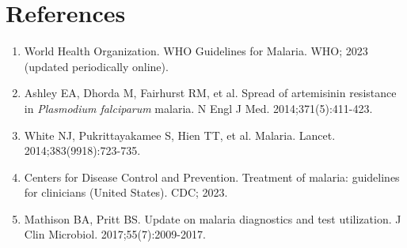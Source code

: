 \section*{References}
\begin{enumerate}
  \item World Health Organization. WHO Guidelines for Malaria. WHO; 2023 (updated periodically online).
  \item Ashley EA, Dhorda M, Fairhurst RM, et al. Spread of artemisinin resistance in \textit{Plasmodium falciparum} malaria. N Engl J Med. 2014;371(5):411-423.
  \item White NJ, Pukrittayakamee S, Hien TT, et al. Malaria. Lancet. 2014;383(9918):723-735.
  \item Centers for Disease Control and Prevention. Treatment of malaria: guidelines for clinicians (United States). CDC; 2023.
  \item Mathison BA, Pritt BS. Update on malaria diagnostics and test utilization. J Clin Microbiol. 2017;55(7):2009-2017.
\end{enumerate}

\clearpage
